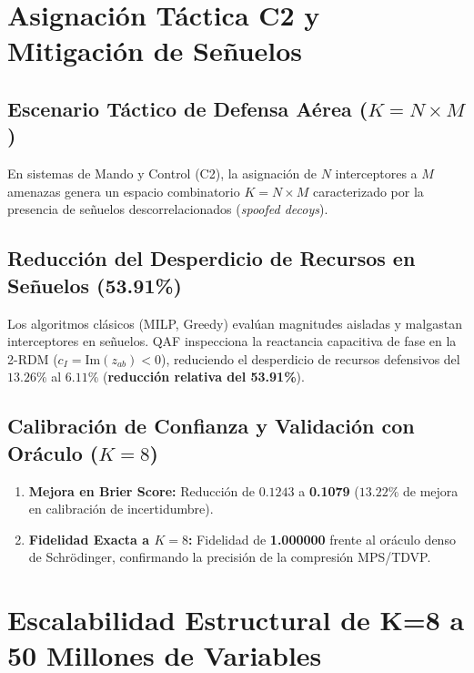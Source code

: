 \documentclass[11pt,a4paper,oneside]{report}
\begin{document}
\chapter{Asignación Táctica C2 y Mitigación de Señuelos}
\label{cap:asignacion_c2_senuelos}

\section{Escenario Táctico de Defensa Aérea ($K = N \times M$)}
En sistemas de Mando y Control (C2), la asignación de $N$ interceptores a $M$ amenazas genera un espacio combinatorio $K = N \times M$ caracterizado por la presencia de señuelos descorrelacionados (\emph{spoofed decoys}).

\section{Reducción del Desperdicio de Recursos en Señuelos (53.91\%)}
Los algoritmos clásicos (MILP, Greedy) evalúan magnitudes aisladas y malgastan interceptores en señuelos. QAF inspecciona la reactancia capacitiva de fase en la 2-RDM ($c_I = \text{Im}(z_{ab}) < 0$), reduciendo el desperdicio de recursos defensivos del $13.26\%$ al $6.11\%$ (\textbf{reducción relativa del 53.91\%}).

\section{Calibración de Confianza y Validación con Oráculo ($K = 8$)}
\begin{enumerate}
    \item \textbf{Mejora en Brier Score:} Reducción de $0.1243$ a \textbf{0.1079} ($13.22\%$ de mejora en calibración de incertidumbre).
    \item \textbf{Fidelidad Exacta a $K = 8$:} Fidelidad de \textbf{1.000000} frente al oráculo denso de Schrödinger, confirmando la precisión de la compresión MPS/TDVP.
\end{enumerate}


\chapter{Escalabilidad Estructural de K=8 a 50 Millones de Variables}
\label{cap:escalabilidad_50m}
\end{document}
